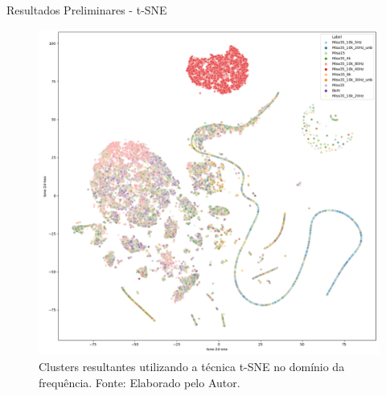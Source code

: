 \documentclass[aspectratio=169]{beamer}
\begin{document}
\begin{frame}{Resultados Preliminares - t-SNE}
	\begin{figure}[HT]
		\begin{center}
			\includegraphics[scale=.19]{../resultados/img/fft-t-sne-1.png}
			\caption{Clusters resultantes utilizando a técnica t-SNE no domínio da frequência. \newline
			Fonte: Elaborado pelo Autor.}
			\label{fig:fft-t-sne-1}
		\end{center}
	\end{figure}
\end{frame}

\end{document}
